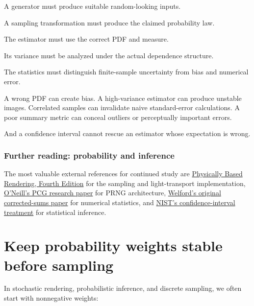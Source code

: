 A generator must produce suitable random-looking inputs.

A sampling transformation must produce the claimed probability law.

The estimator must use the correct PDF and measure.

Its variance must be analyzed under the actual dependence structure.

The statistics must distinguish finite-sample uncertainty from bias and numerical error.

A wrong PDF can create bias. A high-variance estimator can produce unstable images. Correlated samples can invalidate naive standard-error calculations. A poor summary metric can conceal outliers or perceptually important errors.

And a confidence interval cannot rescue an estimator whose expectation is wrong.

\subsubsection{Further reading: probability and inference}\label{02-foundations-ii-ch031-further-reading-probability-and-inference}

\hypertarget{02-foundations-ii-ch031-further-reading-probability-and-inference}{}

The most valuable external references for continued study are \href{https://pbr-book.org/4ed/?utm_source=chatgpt.com}{Physically Based Rendering, Fourth Edition} for the sampling and light-transport implementation, \href{https://www.pcg-random.org/paper.html?utm_source=chatgpt.com}{O'Neill's PCG research paper} for PRNG architecture, \href{https://doi.org/10.1080/00401706.1962.10490022?utm_source=chatgpt.com}{Welford's original corrected-sums paper} for numerical statistics, and \href{https://www.itl.nist.gov/div898/handbook/eda/section3/eda352.htm?utm_source=chatgpt.com}{NIST's confidence-interval treatment} for statistical inference.

\section{Keep probability weights stable before sampling}\label{02-foundations-ii-ch031-keep-probability-weights-stable-before-sampling}

\hypertarget{02-foundations-ii-ch031-keep-probability-weights-stable-before-sampling}{}

In stochastic rendering, probabilistic inference, and discrete sampling, we often start with nonnegative weights:


